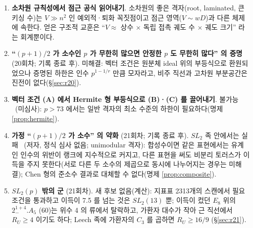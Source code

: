 \begin{enumerate}
\item \textbf{소차원 규칙성에서 점근 공식 읽어내기}. 소차원의 좋은 격자(root, laminated, 큰 키싱 수)는 $V\gg n^2$ 인 예외적·퇴화 꼭짓점이고 점근 영역($V\sim wD$)과 다른 체제에 속한다. 얻은 구조적 교훈은 ``$V\approx$ 상수 $\times$ 독립 접촉 궤도 수 $\times$ 궤도 크기'' 라는 회계뿐이다.
\item \textbf{``$(p+1)/2$ 가 소수인 $p$ 가 무한히 많으면 안정한 $p$ 도 무한히 많다'' 의 증명} (20회차; 기록 종료 후). 미해결: 벡터 조건은 원분체 ideal 위의 부등식으로 환원되었으나 증명된 하한은 인수 $p^{1-1/r}$ 만큼 모자라고, 비주 직선과 고차원 부분공간은 진전이 없다(\S\ref{sec:r20}).
\item \textbf{벡터 조건 (A) 에서 Hermite 형 부등식으로 (B)·(C) 를 끌어내기}. 불가능 \tagP\ (미심사): $p>73$ 에서는 일반 격자의 최소 수준의 하한이 필요하다(명제 \ref{prop:hermite}).
\item \textbf{가정 ``$(p+1)/2$ 가 소수'' 의 약화} (21회차; 기록 종료 후). $SL_2$ 족 안에서는 실패 \tagP\ (저자, 정식 심사 없음; unimodular 격자): 합성수이면 같은 표현에서는 유계인 인수의 위반이 랭크에 지수적으로 커지고, 다른 표현을 써도 비분리 토러스가 이득을 주지 못한다(서로 다른 두 소수의 제곱으로 동시에 나누어지는 경우는 미해결); Chen 형의 준소수 결과로 대체할 수 없다(명제 \ref{prop:composite}).
\item \textbf{$SL_2(p)$ 밖의 군} (21회차). 새 후보 없음(계산): 지표표 2313개의 스캔에서 필요조건을 통과하고 이득이 7.5 를 넘는 것은 $SL_2(13)$ 뿐; 이득이 컸던 $E_8$ 위의 $2^{1+4}_-.A_5$ (60)는 위수 4 의 류에서 탈락하고, 가환자 대수가 작아 근 직선에서 $R_U\ge4$ 이기도 하다; Leech 족에 가환자의 $C_3$ 를 곱하면 $R_U\ge16/9$ (\S\ref{sec:r21}).
\end{enumerate}

